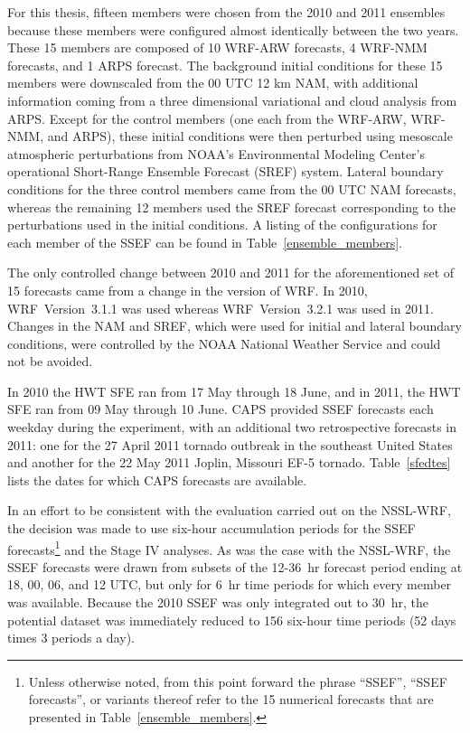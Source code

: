 For this thesis, fifteen members were chosen from the 2010 and 2011 ensembles because these members were configured almost identically between the two years.
These 15 members are composed of 10 WRF-ARW forecasts, 4 WRF-NMM forecasts, and 1 ARPS forecast.
The background initial conditions for these 15 members were downscaled from the 00 UTC 12 km NAM, with additional information coming from a three dimensional variational and cloud analysis from ARPS.
Except for the control members (one each from the WRF-ARW, WRF-NMM, and ARPS), these initial conditions were then perturbed using mesoscale atmospheric perturbations from NOAA's Environmental Modeling Center's operational Short-Range Ensemble Forecast (SREF) system.
Lateral boundary conditions for the three control members came from the 00 UTC NAM forecasts, whereas the remaining 12 members used the SREF forecast corresponding to the perturbations used in the initial conditions.
A listing of the configurations for each member of the SSEF can be found in \mbox{Table \ref{ensemble_members}}.


The only controlled change between 2010 and 2011 for the aforementioned set of 15 forecasts came from a change in the version of WRF. In 2010, \mbox{WRF Version 3.1.1} was used whereas \mbox{WRF Version 3.2.1} was used in 2011.
Changes in the NAM and SREF, which were used for initial and lateral boundary conditions, were controlled by the NOAA National Weather Service and could not be avoided.


In 2010 the HWT SFE ran from 17 May through 18 June, and in 2011, the HWT SFE ran from 09  May through 10 June.
CAPS provided SSEF forecasts each weekday during the experiment, with an additional two retrospective forecasts in 2011: one for the 27 April 2011 tornado outbreak in the southeast United States and another for the 22 May 2011 Joplin, Missouri EF-5 tornado.
\mbox{Table \ref{sfedtes}} lists the dates for which CAPS forecasts are available.


In an effort to be consistent with the evaluation carried out on the NSSL-WRF, the decision was made to use six-hour accumulation periods for the SSEF forecasts\footnote{Unless otherwise noted, from this point forward the phrase ``SSEF'', ``SSEF forecasts'', or variants thereof refer to the 15 numerical forecasts that are presented in \mbox{Table \ref{ensemble_members}}.} and the Stage IV analyses.
As was the case with the NSSL-WRF, the SSEF forecasts were drawn from subsets of the \mbox{12-36 hr} forecast period ending at 18, 00, 06, and 12 UTC, but only for \mbox{6 hr} time periods for which every member was available.
Because the 2010 SSEF was only integrated out to \mbox{30 hr}, the potential dataset was immediately reduced to 156 six-hour time periods (52 days times 3 periods a day).




